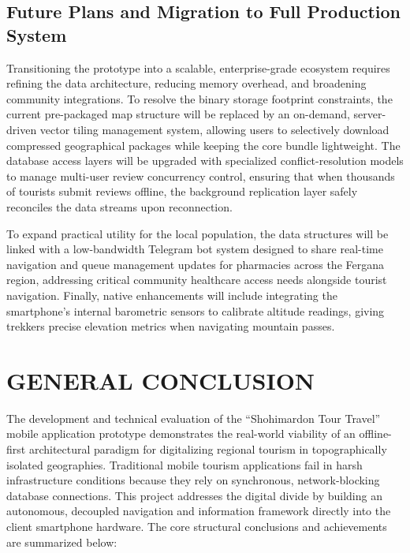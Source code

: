 \documentclass[12pt,a4paper,oneside]{report}
\begin{document}
\section{Future Plans and Migration to Full Production System}

Transitioning the prototype into a scalable, enterprise-grade ecosystem requires refining
the data architecture, reducing memory overhead, and broadening community integrations. To
resolve the binary storage footprint constraints, the current pre-packaged map structure
will be replaced by an on-demand, server-driven vector tiling management system, allowing
users to selectively download compressed geographical packages while keeping the core
bundle lightweight. The database access layers will be upgraded with specialized
conflict-resolution models to manage multi-user review concurrency control, ensuring that
when thousands of tourists submit reviews offline, the background replication layer safely
reconciles the data streams upon reconnection.

To expand practical utility for the local population, the data structures will be linked
with a low-bandwidth Telegram bot system designed to share real-time navigation and queue
management updates for pharmacies across the Fergana region, addressing critical community
healthcare access needs alongside tourist navigation. Finally, native enhancements will
include integrating the smartphone's internal barometric sensors to calibrate altitude
readings, giving trekkers precise elevation metrics when navigating mountain passes.

\chapter*{GENERAL CONCLUSION}

The development and technical evaluation of the ``Shohimardon Tour Travel'' mobile
application prototype demonstrates the real-world viability of an offline-first
architectural paradigm for digitalizing regional tourism in topographically isolated
geographies. Traditional mobile tourism applications fail in harsh infrastructure conditions
because they rely on synchronous, network-blocking database connections. This project
addresses the digital divide by building an autonomous, decoupled navigation and information
framework directly into the client smartphone hardware. The core structural conclusions and
achievements are summarized below:
\end{document}
